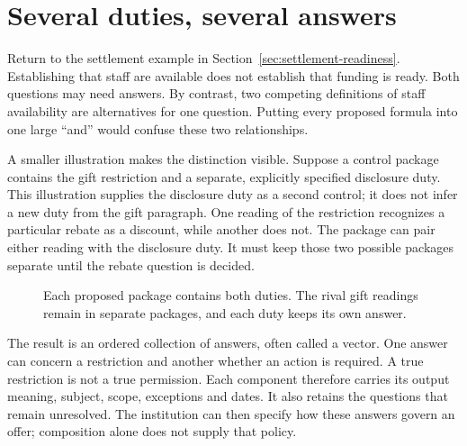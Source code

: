 \documentclass[12pt,a4paper,oneside,openany]{book}
\begin{document}
\section{Several duties, several answers}
\label{sec:control-composition}

Return to the settlement example in Section~\ref{sec:settlement-readiness}.
Establishing that staff are available does not establish that funding is ready.
Both questions may need answers. By contrast, two competing definitions of
staff availability are alternatives for one question. Putting every proposed
formula into one large ``and'' would confuse these two relationships.

A smaller illustration makes the distinction visible. Suppose a control package
contains the gift restriction and a separate, explicitly specified disclosure
duty. This illustration supplies the disclosure duty as a second control; it
does not infer a new duty from the gift paragraph. One reading of the restriction
recognizes a particular rebate as a discount, while another does not. The
package can pair either reading with the disclosure duty. It must keep those
two possible packages separate until the rebate question is decided.

\begin{figure}[htbp]
\centering
{}
\caption{Each proposed package contains both duties. The rival gift readings
remain in separate packages, and each duty keeps its own answer.}
\label{fig:component-alternatives}
\end{figure}

The result is an ordered collection of answers, often called a vector. One
answer can concern a restriction and another whether an action is required.
A true restriction is not a true permission. Each component therefore carries
its output meaning, subject, scope, exceptions and dates. It also retains the
questions that remain unresolved. The institution can then specify how these
answers govern an offer; composition alone does not supply that policy.
\end{document}
